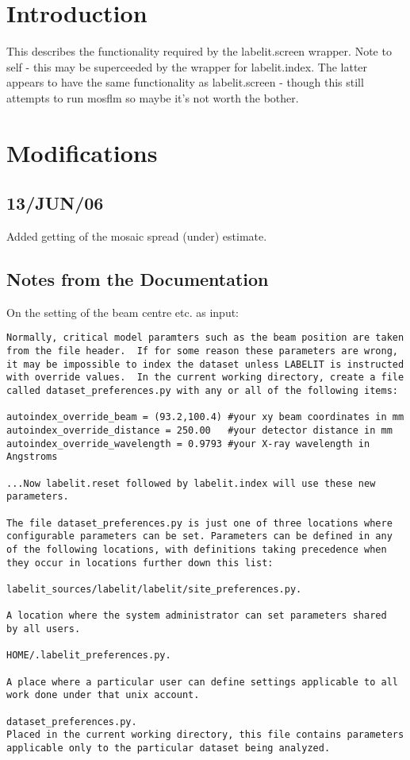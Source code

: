 \documentclass[a4paper, 11pt]{article}
\begin{document}
\section{Introduction}

This describes the functionality required by the labelit.screen wrapper.
Note to self - this may be superceeded by the wrapper for labelit.index.
The latter appears to have the same functionality as labelit.screen - though
this still attempts to run mosflm so maybe it's not worth the bother.

\section{Modifications}

\subsection{13/JUN/06}

Added getting of the mosaic spread (under) estimate.

\subsection{Notes from the Documentation}

On the setting of the beam centre etc. as input:

{
\tiny
\begin{verbatim}
Normally, critical model paramters such as the beam position are taken 
from the file header.  If for some reason these parameters are wrong, 
it may be impossible to index the dataset unless LABELIT is instructed 
with override values.  In the current working directory, create a file 
called dataset_preferences.py with any or all of the following items:

autoindex_override_beam = (93.2,100.4) #your xy beam coordinates in mm
autoindex_override_distance = 250.00   #your detector distance in mm
autoindex_override_wavelength = 0.9793 #your X-ray wavelength in Angstroms

...Now labelit.reset followed by labelit.index will use these new parameters.

The file dataset_preferences.py is just one of three locations where 
configurable parameters can be set. Parameters can be defined in any 
of the following locations, with definitions taking precedence when 
they occur in locations further down this list: 

labelit_sources/labelit/labelit/site_preferences.py. 

A location where the system administrator can set parameters shared 
by all users. 

HOME/.labelit_preferences.py. 

A place where a particular user can define settings applicable to all 
work done under that unix account. 

dataset_preferences.py. 
Placed in the current working directory, this file contains parameters 
applicable only to the particular dataset being analyzed. 
\end{verbatim}
}
\end{document}
